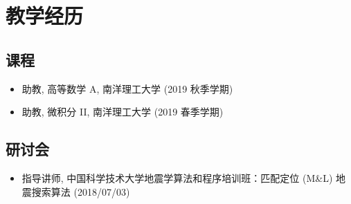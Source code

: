 \section{教学经历}

\subsection{课程}
\begin{itemize}
\item 助教, 高等数学 A, 南洋理工大学 (2019 秋季学期)
\item 助教, 微积分 II, 南洋理工大学 (2019 春季学期)
\end{itemize}

\subsection{研讨会}
\begin{itemize}
	\item 指导讲师, 中国科学技术大学地震学算法和程序培训班：匹配定位 (M&L) 地震搜索算法 (2018/07/03)
\end{itemize}
